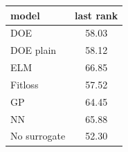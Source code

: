 \begin{tabular}{|lc|}
\hline
model & last rank\\
\hline
DOE & 58.03 \\
DOE plain & 58.12 \\
ELM & 66.85 \\
Fitloss & 57.52 \\
GP & 64.45 \\
NN & 65.88 \\
No surrogate & 52.30 \\
\hline
\end{tabular}
